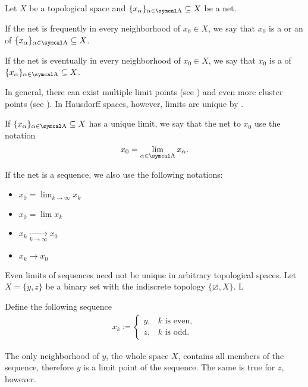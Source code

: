 \begin{definition}\label{def:net_convergence}
  Let \( X \) be a topological space and \( \{ x_\al \}_{\al \in \CA} \subseteq X \) be a net.

  \begin{defenum}
     If the net is frequently in every neighborhood of \( x_0 \in X \), we say that \( x_0 \) is a  or an  of \( \{ x_\al \}_{\al \in \CA} \subseteq X \).

     If the net is eventually in every neighborhood of \( x_0 \in X \), we say that \( x_0 \) is a  of \( \{ x_\al \}_{\al \in \CA} \subseteq X \).
  \end{defenum}

  In general, there can exist multiple limit points (see ) and even more cluster points (see ). In Hausdorff spaces, however, limits are unique by .

  If \( \{ x_\al \}_{\al \in \CA} \subseteq X \) has a unique limit, we say that the net  to \( x_0 \) use the notation
  \begin{equation*}
    x_0 = \lim_{\al \in \CA} x_\al.
  \end{equation*}

  If the net is a sequence, we also use the following notations:
  \begin{itemize}
    \item \( x_0 = \lim_{k \to \infty} x_k \)
    \item \( x_0 = \lim x_k \)
    \item \( x_k \xrightarrow[k \to \infty]{} x_0 \)
    \item \( x_k \to x_0 \)
  \end{itemize}
\end{definition}

\begin{example}\label{ex:multiple_limit_points_of_net}
  Even limits of sequences need not be unique in arbitrary topological spaces. Let \( X = \{ y, z \} \) be a binary set with the indiscrete topology \( \{ \varnothing, X \} \). L

  Define the following sequence
  \begin{align*}
    x_k \coloneqq \begin{cases}
      y, &k \text{ is even}, \\
      z, &k \text{ is odd}.
    \end{cases}
  \end{align*}

  The only neighborhood of \( y \), the whole space \( X \), contains all members of the sequence, therefore \( y \) is a limit point of the sequence. The same is true for \( z \), however.
\end{example}

